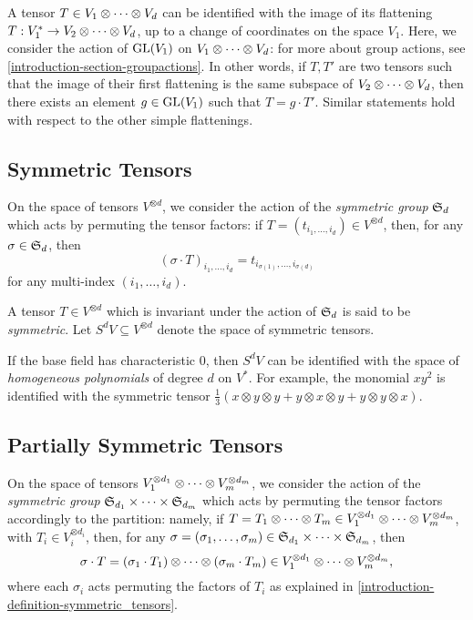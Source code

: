 A tensor $T \in V_1 \otimes \cdots \otimes V_d$ can be identified with the image of its flattening $T : V_1^* \to V_2 \otimes \cdots \otimes V_d$, up to a change of coordinates on the space $V_1$. Here, we consider the action of $\mathrm{GL}(V_1)$ on $V_1 \otimes \cdots \otimes V_d$: for more about group actions, see \ref{introduction-section-groupactions}. In other words, if $T,T'$ are two tensors such that the image of their first flattening is the same subspace of $V_2 \otimes \cdots \otimes V_d$, then there exists an element $g \in \mathrm{GL}(V_1)$ such that $T = g\cdot T'$. Similar statements hold with respect to the other simple flattenings.

\subsection{Symmetric Tensors}
\label{introduction-subsection-symmetric_tensors}

On the space of tensors $V^{\otimes d}$, we consider the action of the \emph{symmetric group} $\mathfrak{S}_d$ which acts by permuting the tensor factors: if $T = (t_{i_1,\ldots,i_d}) \in V^{\otimes d}$, then, for any $\sigma \in \mathfrak{S}_d$, then \[(\sigma \cdot T)_{i_1,\ldots,i_d} = t_{i_{\sigma(1)},\ldots,i_{\sigma(d)}}\] for any multi-index $(i_1,\ldots,i_d)$. 
\begin{definition}
\label{introduction-definition-symmetric_tensors}
A tensor $T \in V^{\otimes d}$ which is invariant under the action of $\mathfrak{S}_d$ is said to be \emph{symmetric}. Let $S^d V \subseteq V^{\otimes d}$ denote the space of symmetric tensors. 

If the base field has characteristic $0$, then $S^d V$ can be identified with the space of \emph{homogeneous polynomials} of degree $d$ on $V^*$. For example, the monomial $xy^2$ is identified with the symmetric tensor $\frac{1}{3}\left(x\otimes y \otimes y + y\otimes x \otimes y + y\otimes y \otimes x\right)$.
\end{definition}

\subsection{Partially Symmetric Tensors}
\label{introduction-subsection-partially_symmetric_tensors}
On the space of tensors $V_1^{\otimes d_1}\otimes \cdots \otimes V_m^{\otimes d_m}$, we consider the action of the \emph{symmetric group} $\mathfrak{S}_{d_1} \times \cdots \times \mathfrak{S}_{d_m}$ which acts by permuting the tensor factors accordingly to the partition: namely, if $T = T_1 \otimes \cdots \otimes T_m \in V_1^{\otimes d_1}\otimes \cdots \otimes V_m^{\otimes d_m}$, with $T_i \in V_i^{\otimes d_i}$, then, for any $\sigma = (\sigma_1,\ldots,\sigma_m)\in \mathfrak{S}_{d_1} \times \cdots \times \mathfrak{S}_{d_m}$, then \[\sigma \cdot T = (\sigma_1\cdot T_1) \otimes \cdots \otimes (\sigma_m\cdot T_m) \in V_1^{\otimes d_1}\otimes \cdots \otimes V_m^{\otimes d_m},\] where each $\sigma_i$ acts permuting the factors of $T_i$ as explained in \ref{introduction-definition-symmetric_tensors}.

